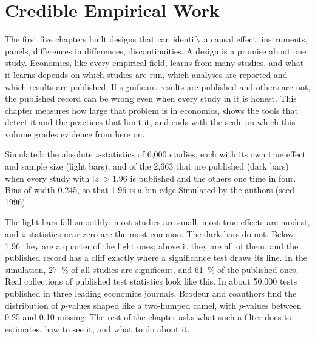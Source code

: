 \chapter{Credible Empirical Work}\label{ch:b3:credible-empirical-work}

The first five chapters built designs that can identify a causal effect:
instruments, panels, differences in differences, discontinuities. A design is
a promise about one study. Economics, like every empirical field, learns from
many studies, and what it learns depends on which studies are run, which
analyses are reported and which results are published. If significant results
are published and others are not, the published record can be wrong even when
every study in it is honest. This chapter measures how large that problem is
in economics, shows the tools that detect it and the practices that limit it,
and ends with the scale on which this volume grades evidence from here on.

\begin{openingchart}{Simulated: the absolute $z$-statistics of 6{,}000
studies, each with its own true effect and sample size (light bars), and of the
2{,}663 that are published (dark bars) when every study with $|z| > 1.96$ is
published and the others one time in four. Bins of width 0.245, so that 1.96 is
a bin edge.}{Simulated by the authors (seed 1996)}
\end{openingchart}

The light bars fall smoothly: most studies are small, most true effects are
modest, and $z$-statistics near zero are the most common. The dark bars do not.
Below 1.96 they are a quarter of the light ones; above it they are all of
them, and the published record has a cliff exactly where a significance test
draws its line. In the simulation, 27~\% of all studies are significant, and
61~\% of the published ones. %
Real collections of published test statistics look like this. In about 50{,}000
tests published in three leading economics journals, Brodeur and coauthors find
the distribution of $p$-values shaped like a two-humped camel, with $p$-values
between 0.25 and 0.10 missing. %
The rest of the chapter asks what such a filter does to estimates, how to see
it, and what to do about it.

